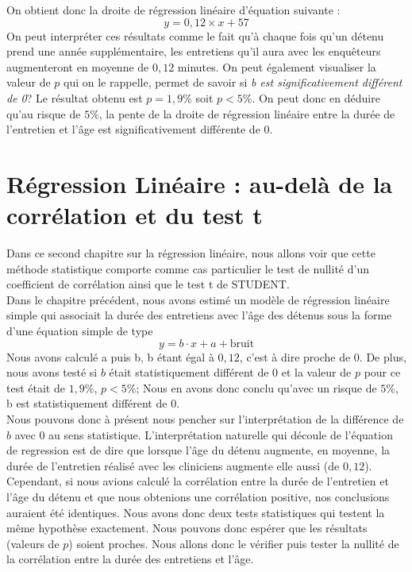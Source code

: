 On obtient donc la droite de régression linéaire d'équation suivante : 
$$y = 0,12\times x + 57$$
On peut interpréter ces résultats comme le fait qu'à chaque fois qu'un détenu prend une année supplémentaire, les entretiens qu'il aura avec les enquêteurs augmenteront en moyenne de $0,12$ minutes.\newline
On peut également visualiser la valeur de $p$ qui on le rappelle, permet de savoir si \textit{b est significativement différent de 0}? Le résultat obtenu est $p=1,9\%$ soit $p<5\%$. On peut donc en déduire qu'au risque de $5\%$, la pente de la droite de régression linéaire entre la durée de l'entretien et l'âge est significativement différente de $0$.
\newpage
\section{Régression Linéaire : au-delà de la corrélation et du test t}
Dans ce second chapitre sur la régression linéaire, nous allons voir que cette méthode statistique comporte comme cas particulier le test de nullité d'un coefficient de corrélation ainsi que le test t de STUDENT.\newline
\\
Dans le chapitre précédent, nous avons estimé un modèle de régression linéaire simple qui associait la durée des entretiens avec l'âge des détenus sous la forme d'une équation simple de type 
$$y=b\cdot x + a + \textrm{bruit}$$
Nous avons calculé a puis b, b étant égal à $0,12$, c'est à dire proche de $0$. De plus, nous avons testé si $b$ était statistiquement différent de $0$ et la valeur de $p$ pour ce test était de $1,9\%$, $p<5\%$; Nous en avons donc conclu qu'avec un risque de $5\%$, b est statistiquement différent de $0$.\newline
\\
Nous pouvons donc à présent nous pencher sur l'interprétation de la différence de $b$ avec $0$ au sens statistique.\newline
L'interprétation naturelle qui découle de l'équation de regression est de dire que lorsque l'âge du détenu augmente, en moyenne, la durée de l'entretien réalisé avec les cliniciens augmente elle aussi (de $0,12$).\newline
Cependant, si nous avions calculé la corrélation entre la durée de l'entretien et l'âge du détenu et que nous obtenions une corrélation positive, nos conclusions auraient été identiques.\newline
Nous avons donc deux tests statistiques qui testent la même hypothèse exactement. Nous pouvons donc espérer que les résultats (valeurs de $p$) soient proches. Nous allons donc le vérifier puis tester la nullité de la corrélation entre la durée des entretiens et l'âge.\newline
